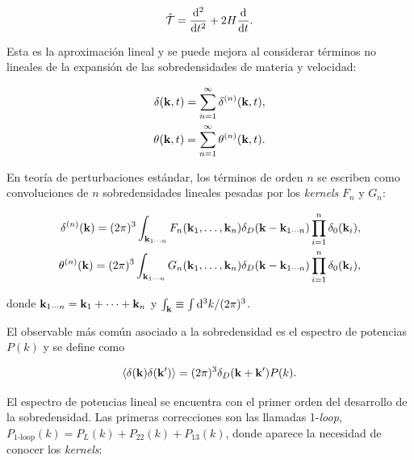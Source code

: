 \documentclass[letterpaper, 12pt]{article}
\begin{document}
            \begin{equation}
                \hat{\mathcal{T}} = \dv[2]{}{t} + 2H\dv{}{t}.
            \end{equation}

            Esta es la aproximación lineal y se puede mejora al considerar términos no lineales de la expansión de las sobredensidades de materia y velocidad:
            
            \begin{align}
                \delta(\vb{k},t) = \sum_{n = 1}^\infty \delta^{(n)}(\vb{k},t), \\
                \theta(\vb{k},t) = \sum_{n = 1}^\infty \theta^{(n)}(\vb{k},t).
            \end{align}

            En teoría de perturbaciones estándar, los términos de orden $n$ se escriben como convoluciones de $n$ sobredensidades lineales pesadas por los \emph{kernels} $F_n$ y $G_n$:
            
            \begin{align}
                \delta^{(n)}(\vb{k}) = 
                (2\pi)^3 \int_{\vb{k}_{1\cdots n}} F_n(\vb{k}_1,\ldots,\vb{k}_n) 
                \delta_D\qty(\vb{k}-\vb{k}_{1\cdots n}) \prod_{i=1}^{n}\delta_0(\vb{k}_i), \\
                \theta^{(n)}(\vb{k}) = 
                (2\pi)^3 \int_{\vb{k}_{1\cdots n}} G_n(\vb{k}_1,\ldots,\vb{k}_n) 
                \delta_D\qty(\vb{k}-\vb{k}_{1\cdots n}) \prod_{i=1}^{n}\delta_0(\vb{k}_i),
            \end{align}
            
            donde $\vb{k}_{1\cdots n} = \vb{k}_1 + \cdots + \vb{k}_n$ y $\int_{\vb{k}} \equiv \int\dd^3k/(2\pi)^3$.

            El observable más común asociado a la sobredensidad es el espectro de potencias $P(k)$ y se define como

            \begin{equation}
                \expval{\delta(\vb{k})\delta(\vb{k}')}=(2\pi)^3\delta_D(\vb{k}+\vb{k}')P(k).
            \end{equation}

            El espectro de potencias lineal se encuentra con el primer orden del desarrollo de la sobredensidad. Las primeras correcciones son las llamadas 1-\emph{loop}, $P_\text{1-loop}(k) = P_L(k) + P_{22}(k) + P_{13}(k)$, donde aparece la necesidad de conocer los \emph{kernels}:
\end{document}
